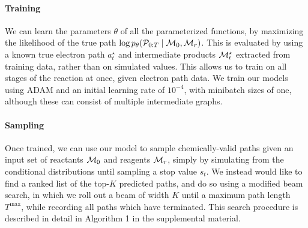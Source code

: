 \paragraph{Training}
We can learn the parameters $\theta$ of all the parameterized functions, by maximizing the likelihood of the true path $\log p_\theta({\mathcal{P}}_{0:T} \mid {\mathcal{M}}_0, {\mathcal{M}}_r)$.
This is evaluated by using a known true electron path $a_t^\star$ and intermediate products ${\mathcal{M}}_t^\star$ extracted from training data,
rather than on simulated values. 
This allows us to train on all stages of the reaction at once, given electron path data.
We train our models using ADAM \citep{kingma2014adam} and an initial learning rate of $10^{-4}$,
with minibatch sizes of one, although these can consist of multiple intermediate graphs.

\paragraph{Sampling}
Once trained, we can use our model to sample chemically-valid paths given an input set of reactants ${\mathcal{M}}_0$ and reagents ${\mathcal{M}}_r$, 
simply by simulating from the conditional distributions until sampling a stop value $s_t$.
We instead would like to find a ranked list of the top-$K$ predicted paths, and do so using a modified beam search,
in which we roll out a beam of width $K$ until a maximum path length $T^\mathrm{max}$,
while recording all paths which have terminated.
This search procedure is described in detail in Algorithm 1 in the supplemental material.



